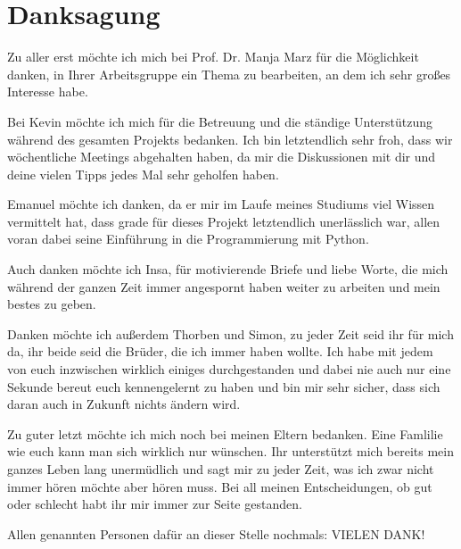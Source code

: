 \chapter*{Danksagung}


Zu aller erst möchte ich mich bei Prof. Dr. Manja Marz für die Möglichkeit danken, in Ihrer Arbeitsgruppe ein Thema zu bearbeiten, an dem ich sehr großes Interesse habe.

\vspace{1em}

Bei Kevin möchte ich mich für die Betreuung und die ständige Unterstützung während des gesamten Projekts bedanken. Ich bin letztendlich sehr froh, dass wir wöchentliche Meetings abgehalten haben, da mir die Diskussionen mit dir und deine vielen Tipps jedes Mal sehr geholfen haben. 

\vspace{1em}

Emanuel möchte ich danken, da er mir im Laufe meines Studiums viel Wissen vermittelt hat, dass grade für dieses Projekt letztendlich unerlässlich war, allen voran dabei seine Einführung in die Programmierung mit Python.



\vspace{1em}

Auch danken möchte ich Insa, für motivierende Briefe und liebe Worte, die mich während der ganzen Zeit immer angespornt haben weiter zu arbeiten und mein bestes zu geben.

\vspace{1em}

Danken möchte ich außerdem Thorben und Simon, zu jeder Zeit seid ihr für mich da, ihr beide seid die Brüder, die ich immer haben wollte. Ich habe mit jedem von euch inzwischen wirklich einiges durchgestanden und dabei nie auch nur eine Sekunde bereut euch kennengelernt zu haben und bin mir sehr sicher, dass sich daran auch in Zukunft nichts ändern wird.

\vspace{1em}

Zu guter letzt möchte ich mich noch bei meinen Eltern bedanken. Eine Famlilie wie euch kann man sich wirklich nur wünschen. Ihr unterstützt mich bereits mein ganzes Leben lang unermüdlich und sagt mir zu jeder Zeit, was ich zwar nicht immer hören möchte aber hören muss. Bei all meinen Entscheidungen, ob gut oder schlecht habt ihr mir immer zur Seite gestanden. 

\vspace{1em}

Allen genannten Personen dafür an dieser Stelle nochmals: VIELEN DANK!